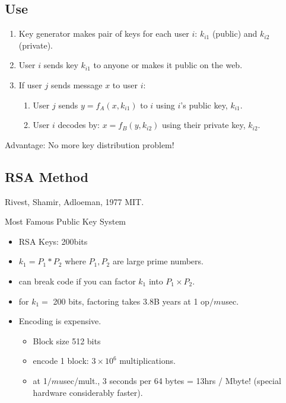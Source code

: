 \subsection{Use}
\begin{enumerate}
	\item Key generator makes pair of keys for each user $i$:
        $k_{i1}$ (public) and $k_{i2}$ (private).

        \item User $i$ sends key $k_{i1}$ to anyone or makes it public
        on the web.

        \item If user $j$ sends message $x$ to user $i$:
        \begin{enumerate}
        	\item User $j$ sends $y = f_A(x, k_{i1})$ to $i$
                using $i$'s public key, $k_{i1}$.

                \item User $i$ decodes by: $x = f_B(y, k_{i2})$ using
                their private key, $k_{i2}$.
       \end{enumerate}
 \end{enumerate}

Advantage:  No more key distribution problem!


\subsection{RSA Method}
Rivest, Shamir, Adloeman, 1977 MIT.

Most Famous Public Key System

\begin{itemize}
\item RSA Keys:  200bits
\item $k_1 = P_1 * P_2$ where $P_1, P_2$ are large prime numbers.
\item can break code if you can factor $k_1$ into $P_1 \times P_2$.
\item for $k_1 =$ 200 bits, factoring takes 3.8B years at 1 op$/mu$sec.
\item Encoding is expensive.
\begin{itemize}
	\item Block size 512 bits
        \item encode 1 block:  $3\times 10^6$ multiplications.
        \item at 1$/mu$sec/mult.,  3 seconds per 64 bytes = 13hrs / Mbyte!
        (special hardware considerably faster).
        \end{itemize}
\end{itemize}



